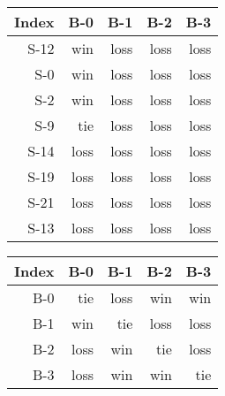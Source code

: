 \begin{tabular}{ | r | r | r | r | r | }
    \hline
        Index  &    B-0  &    B-1  &    B-2  &    B-3  \\
    \hline
    \hline
         S-12  &    win  &   loss  &   loss  &   loss  \\
    \hline
          S-0  &    win  &   loss  &   loss  &   loss  \\
    \hline
          S-2  &    win  &   loss  &   loss  &   loss  \\
    \hline
          S-9  &    tie  &   loss  &   loss  &   loss  \\
    \hline
         S-14  &   loss  &   loss  &   loss  &   loss  \\
    \hline
         S-19  &   loss  &   loss  &   loss  &   loss  \\
    \hline
         S-21  &   loss  &   loss  &   loss  &   loss  \\
    \hline
         S-13  &   loss  &   loss  &   loss  &   loss  \\
    \hline
\end{tabular}


\begin{tabular}{ | r | r | r | r | r | }
    \hline
        Index  &    B-0  &    B-1  &    B-2  &    B-3  \\
    \hline
    \hline
          B-0  &    tie  &   loss  &    win  &    win  \\
    \hline
          B-1  &    win  &    tie  &   loss  &   loss  \\
    \hline
          B-2  &   loss  &    win  &    tie  &   loss  \\
    \hline
          B-3  &   loss  &    win  &    win  &    tie  \\
    \hline
\end{tabular}




